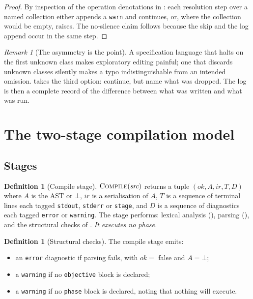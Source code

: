 \documentclass[11pt,twocolumn,a4paper]{article}
\theoremstyle{ssthm}
\theoremstyle{definition}
\newtheorem{definition}[theorem]{Definition}
\theoremstyle{remark}
\newtheorem{remark}[theorem]{Remark}
\newcommand{\shk}[1]{\texttt{#1}}
\begin{document}
\begin{proof}
By inspection of the operation denotations in : each
resolution step over a named collection either appends a \shk{warn} and
continues, or, where the collection would be empty, raises. The
no-silence claim follows because the skip and the log append occur in the
same step.
\end{proof}

\begin{remark}[The asymmetry is the point]
\label{rem:asymmetry}
A specification language that halts on the first unknown class makes
exploratory editing painful; one that discards unknown classes silently
makes a typo indistinguishable from an intended omission.
 takes the third option: continue, but
name what was dropped. The log is then a complete record of the
difference between what was written and what was run.
\end{remark}

\section{The two-stage compilation model}
\label{sec:stages}

\subsection{Stages}

\begin{definition}[Compile stage]
\label{def:compile-stage}
$\textsc{Compile}(\mathit{src})$ returns a tuple
$(\mathit{ok}, A, \mathit{ir}, T, D)$ where $A$ is the AST or
$\bot$, $\mathit{ir}$ is a serialisation of $A$, $T$ is a sequence of
terminal lines each tagged \shk{stdout}, \shk{stderr} or \shk{stage}, and
$D$ is a sequence of diagnostics each tagged \shk{error} or
\shk{warning}. The stage performs: lexical analysis
(), parsing (), and the structural
checks of . \emph{It executes no phase.}
\end{definition}

\begin{definition}[Structural checks]
\label{def:structural}
The compile stage emits:
\begin{itemize}[leftmargin=1.6em,itemsep=1pt]
\item an \shk{error} diagnostic if parsing fails, with $\mathit{ok}=$ false
      and $A=\bot$;
\item a \shk{warning} if no \shk{objective} block is declared;
\item a \shk{warning} if no \shk{phase} block is declared, noting that
      nothing will execute.
\end{itemize}
\end{definition}
\end{document}

